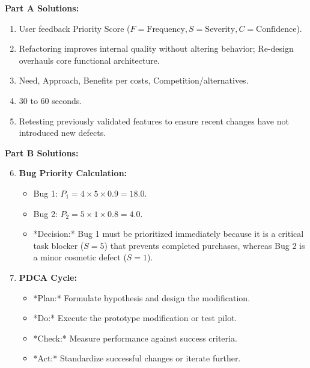 \begin{solutionbox}
\textbf{Part A Solutions:}
\begin{enumerate}[leftmargin=1.2em, itemsep=2pt]
    \item User feedback Priority Score ($F = \text{Frequency}, S = \text{Severity}, C = \text{Confidence}$).
    \item Refactoring improves internal quality without altering behavior; Re-design overhauls core functional architecture.
    \item Need, Approach, Benefits per costs, Competition/alternatives.
    \item 30 to 60 seconds.
    \item Retesting previously validated features to ensure recent changes have not introduced new defects.
\end{enumerate}

\textbf{Part B Solutions:}
\begin{enumerate}[leftmargin=1.2em, itemsep=3pt]
    \setcounter{enumi}{5}
    \item \textbf{Bug Priority Calculation:}
    \begin{itemize}
        \item Bug 1: $P_1 = 4 \times 5 \times 0.9 = \mathbf{18.0}$.
        \item Bug 2: $P_2 = 5 \times 1 \times 0.8 = \mathbf{4.0}$.
        \item *Decision:* Bug 1 must be prioritized immediately because it is a critical task blocker ($S=5$) that prevents completed purchases, whereas Bug 2 is a minor cosmetic defect ($S=1$).
    \end{itemize}
    \item \textbf{PDCA Cycle:}
    \begin{itemize}
        \item *Plan:* Formulate hypothesis and design the modification.
        \item *Do:* Execute the prototype modification or test pilot.
        \item *Check:* Measure performance against success criteria.
        \item *Act:* Standardize successful changes or iterate further.
    \end{itemize}
\end{enumerate}


\end{solutionbox}
